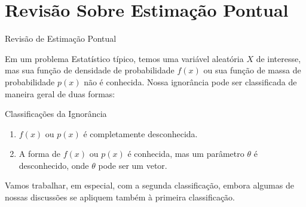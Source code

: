 \documentclass[12pt]{beamer}
\begin{document}
%

\section{Revisão Sobre Estimação Pontual}

\begin{frame}{Revisão de Estimação Pontual}
	\begin{block}{}
		\justifying
		\nocite{hogg, casella2021statistical}
		Em um problema Estatístico típico, temos uma variável aleatória $X$ de interesse, mas sua função de densidade de probabilidade $f(x)$ ou sua função de massa de probabilidade $p(x)$ não é conhecida. Nossa ignorância pode ser classificada de maneira geral de duas formas:
	\end{block}
	\pause
	\begin{block}{Classificações da Ignorância}
		\begin{enumerate}
			\item $f(x)$ ou $p(x)$ é completamente desconhecida.
			\item A forma de $f(x)$ ou $p(x)$ é conhecida, mas um parâmetro $\theta$ é desconhecido, onde $\theta$ pode ser um vetor.
		\end{enumerate}
			\justifying
		Vamos trabalhar, em especial, com a segunda classificação, embora algumas de nossas discussões se apliquem também à primeira classificação.
	\end{block}
\end{frame}
\end{document}
